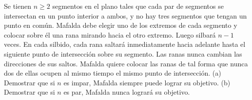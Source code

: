 Se tienen $n \ge 2$ segmentos en el plano tales que cada par de segmentos se intersectan en un punto interior a ambos, y no hay tres segmentos que tengan un punto en común. Mafalda debe elegir uno de los extremos de cada segmento y colocar sobre él una rana mirando hacia el otro extremo. Luego silbará $n−1$ veces. En cada silbido, cada rana saltará inmediatamente hacia adelante hasta el siguiente punto de intersección sobre su segmento. Las ranas nunca cambian las direcciones de sus saltos. Mafalda quiere colocar las ranas de tal forma que nunca dos de ellas ocupen al mismo tiempo el mismo punto de intersección. \newline 
(a) Demostrar que si $n$ es impar, Mafalda siempre puede lograr su objetivo.  \newline 
(b) Demostrar que si $n$ es par, Mafalda nunca logrará su objetivo.